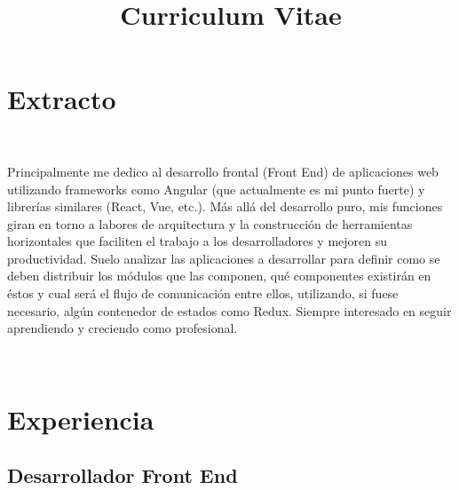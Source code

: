 \documentclass[11pt,a4paper,sans]{moderncv}   %
\title{Curriculum Vitae}                      %
\begin{document}
\maketitle
\vspace{-1.5\baselineskip}

\section{Extracto}
\textsc{\\ }


Principalmente me dedico al desarrollo frontal (Front End) de aplicaciones web utilizando frameworks como Angular (que actualmente es mi punto fuerte) y librerías similares (React, Vue, etc.). Más allá del desarrollo puro, mis funciones giran en torno a labores de arquitectura y la construcción de herramientas horizontales que faciliten el trabajo a los desarrolladores y mejoren su productividad.
\newline{}\newline{}
Suelo analizar las aplicaciones a desarrollar para definir como se deben distribuir los módulos que las componen, qué componentes existirán en éstos y cual será el flujo de comunicación entre ellos, utilizando, si fuese necesario, algún contenedor de estados como Redux.
\newline{}\newline{}
Siempre interesado en seguir aprendiendo y creciendo como profesional.

\textsc{\\ }

\section{Experiencia}

\subsection{Desarrollador Front End}

\end{document}
